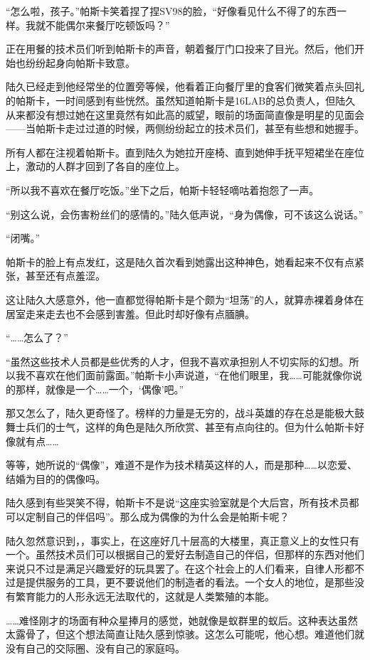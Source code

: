 “怎么啦，孩子。”帕斯卡笑着捏了捏SV98的脸，“好像看见什么不得了的东西一样。我就不能偶尔来餐厅吃顿饭吗？”

正在用餐的技术员们听到帕斯卡的声音，朝着餐厅门口投来了目光。然后，他们开始也纷纷起身向帕斯卡致意。

陆久已经走到他经常坐的位置旁等候，他看着正向餐厅里的食客们微笑着点头回礼的帕斯卡，一时间感到有些恍然。虽然知道帕斯卡是16LAB的总负责人，但陆久从来都没有想过她在这里竟然有如此高的威望，眼前的场面简直像是明星的见面会——当帕斯卡走过过道的时候，两侧纷纷起立的技术员们，甚至有些想和她握手。

所有人都在注视着帕斯卡。直到陆久为她拉开座椅、直到她伸手抚平短裙坐在座位上，激动的人群才回到了各自的座位上。

“所以我不喜欢在餐厅吃饭。”坐下之后，帕斯卡轻轻嘀咕着抱怨了一声。

“别这么说，会伤害粉丝们的感情的。”陆久低声说，“身为偶像，可不该这么说话。”

“闭嘴。”

帕斯卡的脸上有点发红，这是陆久首次看到她露出这种神色，她看起来不仅有点紧张，甚至还有点羞涩。

这让陆久大感意外，他一直都觉得帕斯卡是个颇为“坦荡”的人，就算赤裸着身体在居室走来走去也不会感到害羞。但此时却好像有点腼腆。

“……怎么了？”

“虽然这些技术人员都是些优秀的人才，但我不喜欢承担别人不切实际的幻想。所以我不喜欢在他们面前露面。”帕斯卡小声说道，“在他们眼里，我……可能就像你说的那样，就像是一个……一个，‘偶像’吧。”

那又怎么了，陆久更奇怪了。榜样的力量是无穷的，战斗英雄的存在总是能极大鼓舞士兵们的士气，这样的角色是陆久所欣赏、甚至有点向往的。但为什么帕斯卡好像就有点……

等等，她所说的“偶像”，难道不是作为技术精英这样的人，而是那种……以恋爱、结婚为目的的偶像吗。

陆久感到有些哭笑不得，帕斯卡不是说“这座实验室就是个大后宫，所有技术员都可以定制自己的伴侣吗”。那么成为偶像的为什么会是帕斯卡呢？

陆久忽然意识到，，事实上，在这座好几十层高的大楼里，真正意义上的女性只有一个。虽然技术员们可以根据自己的爱好去制造自己的伴侣，但那样的东西对他们来说只不过是满足兴趣爱好的玩具罢了。在这个社会上的人们看来，自律人形都不过是提供服务的工具，更不要说他们的制造者的看法。一个女人的地位，是那些没有繁育能力的人形永远无法取代的，这就是人类繁殖的本能。

……难怪刚才的场面有种众星捧月的感觉，她就像是蚁群里的蚁后。这种表达虽然太露骨了，但这个想法简直让陆久感到惊骇。这怎么可能呢，他心想。难道他们就没有自己的交际圈、没有自己的家庭吗。

